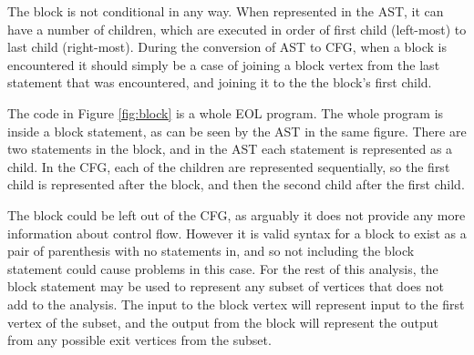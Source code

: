 The block is not conditional in any way. When represented in the AST, it can have a number of children, which are executed in order of first child (left-most) to last child (right-most). During the conversion of AST to CFG, when a block is encountered it should simply be a case of joining a block vertex from the last statement that was encountered, and joining it to the the block's first child.

The code in Figure \ref{fig:block} is a whole EOL program. The whole program is inside a block statement, as can be seen by the AST in the same figure. There are two statements in the block, and in the AST each statement is represented as a child. In the CFG, each of the children are represented sequentially, so the first child is represented after the block, and then the second child after the first child.

The block could be left out of the CFG, as arguably it does not provide any more information about control flow. However it is valid syntax for a block to exist as a pair of parenthesis with no statements in, and so not including the block statement could cause problems in this case. For the rest of this analysis, the block statement may be used to represent any subset of vertices that does not add to the analysis. The input to the block vertex will represent input to the first vertex of the subset, and the output from the block will represent the output from any possible exit vertices from the subset.

